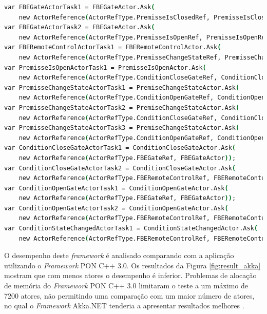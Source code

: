 \begin{lstlisting}[language = csh, caption = {Conexão entre atores em Akka.NET}, %float=htb,
source = {Adaptado de \citeonline{martini_2019}}, label = {cod:akka_link}, language={csh}]
var FBEGateActorTask1 = FBEGateActor.Ask(
    new ActorReference(ActorRefType.PremisseIsClosedRef, PremisseIsClosedActor));
var FBEGateActorTask2 = FBEGateActor.Ask(
    new ActorReference(ActorRefType.PremisseIsOpenRef, PremisseIsOpenRefActor));
var FBERemoteControlActorTask1 = FBERemoteControlActor.Ask(
    new ActorReference(ActorRefType.PremisseChangeStateRef, PremisseChangeStateActor));
var PremisseIsOpenActorTask1 = PremisseIsOpenActor.Ask(
    new ActorReference(ActorRefType.ConditionCloseGateRef, ConditionCloseGateActor));
var PremisseChangeStateActorTask1 = PremiseChangeStateActor.Ask(
    new ActorReference(ActorRefType.ConditionOpenGateRef, ConditionOpenGateActor));
var PremisseChangeStateActorTask2 = PremiseChangeStateActor.Ask(
    new ActorReference(ActorRefType.ConditionCloseGateRef, ConditionCloseGateActor));
var PremisseChangeStateActorTask3 = PremiseChangeStateActor.Ask(
    new ActorReference(ActorRefType.ConditionOpenGateRef, ConditionOpenGateActor));
var ConditionCloseGateActorTask1 = ConditionCloseGateActor.Ask(
    new ActorReference(ActorRefType.FBEGateRef, FBEGateActor));
var ConditionCloseGateActorTask2 = ConditionCloseGateActor.Ask(
    new ActorReference(ActorRefType.FBERemoteControlRef, FBERemoteControlActor));
var ConditionOpenGateActorTask1 = ConditionOpenGateActor.Ask(
    new ActorReference(ActorRefType.FBEGateRef, FBEGateActor));
var ConditionOpenGateActorTask2 = ConditionOpenGateActor.Ask(
    new ActorReference(ActorRefType.FBERemoteControlRef, FBERemoteControlActor));
var ConditionStateChangedActorTask1 = ConditionStateChangedActor.Ask(
    new ActorReference(ActorRefType.FBERemoteControlRef, FBERemoteControlActor));
\end{lstlisting}

O desempenho deste \textit{framework} é analisado comparando com a aplicação
utilizando o \textit{Framework} PON C++ 3.0. Os resultados da Figura
\ref{fig:result_akka} mostram que com menos atores o desempenho é inferior.
Problemas de alocação de memória do \textit{Framework} PON C++ 3.0 limitaram o
teste a um máximo de 7200 atores, não permitindo uma comparação com um maior
número de atores, no qual o \textit{Framework} Akka.NET tenderia a apresentar
resultados melhores \cite{martini_2019}.

